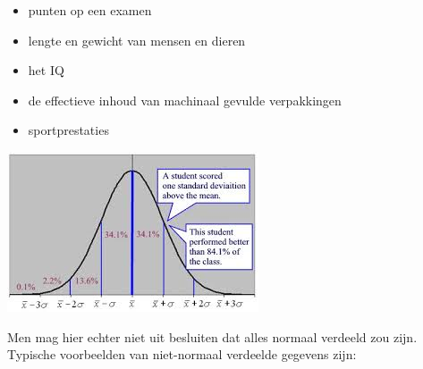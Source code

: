 \documentclass[a4paper,12pt, twoside]{article}
\begin{document}
\begin{minipage}{0.5\textwidth}
\begin{itemize}
  \item punten op een examen
  \item lengte en gewicht van mensen en dieren
  \item het IQ
  \item de effectieve inhoud van machinaal gevulde verpakkingen
  \item sportprestaties
\end{itemize}
\vspace*{1cm}
\end{minipage}
\begin{minipage}{0.5\textwidth}
  \begin{center}
    \includegraphics[width=\textwidth]{student_score}
  \end{center}
\end{minipage}

Men mag hier echter niet uit besluiten dat alles normaal verdeeld zou zijn. Typische voorbeelden van niet-normaal verdeelde gegevens zijn:
\end{document}
